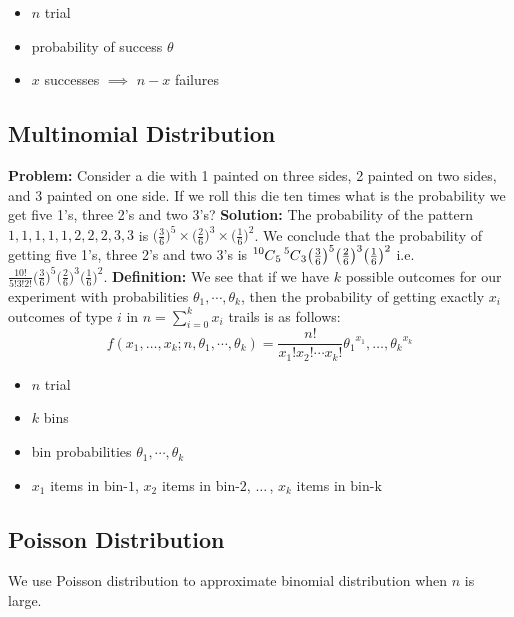 \documentclass{book}
\newcommand\Mycomb[2][^n]{\prescript{#1\mkern-0.5mu}{}C_{#2}}
\begin{document}
\begin{itemize}
\item $n$ trial
\item probability of success $\theta$
\item $x$ successes $\implies$ $n-x$ failures
\end{itemize}

\subsection{Multinomial Distribution}
\textbf{Problem:} Consider a die with 1 painted on three sides, 2 painted on two sides, and 3 painted on one side. If we roll this die ten times what is the probability we get five 1's, three 2's and two 3's? \newline
\textbf{Solution:} The probability of the pattern $1,1,1,1,1,2,2,2,3,3$ is $\big(\frac{3}{6}\big)^5 \times \big(\frac{2}{6}\big)^3 \times \big( \frac{1}{6}\big)^2$. We conclude that the probability of getting five 1's, three 2's and two 3's is $\Mycomb[10]{5}\Mycomb[5]{3}\big(\frac{3}{6}\big)^5\big(\frac{2}{6}\big)^3\big( \frac{1}{6}\big)^2$  i.e.\ $\frac{10!}{5!3!2!}\big(\frac{3}{6}\big)^5\big(\frac{2}{6}\big)^3\big( \frac{1}{6}\big)^2$. 
\newline
\textbf{Definition:} We see that if we have $k$ possible outcomes for our experiment with probabilities ${\theta}_1,\cdots,{\theta}_k$, then the probability of getting exactly $x_i$ outcomes of type $i$ in $n = {\sum}_{i=0}^{k}{x_i}$ trails is as follows: \newline \[f(x_1,\dots,x_k;n,{\theta}_1,\cdots,{\theta}_k) = \frac{n!}{x_1!x_2!\cdots x_k!}{\theta_1}^{x_1},\dots,{\theta_k}^{x_k}\]

\begin{itemize}
\item $n$ trial
\item $k$ bins
\item bin probabilities ${\theta}_1,\cdots,{\theta}_k$
\item $x_1$ items in $\text{bin-1}$, $x_2$ items in $\text{bin-2}$, $\dots \,$, $x_k$ items in $\text{bin-k}$
\end{itemize}

\subsection{Poisson Distribution}
We use Poisson distribution to approximate binomial distribution when $n$ is large.
\end{document}

